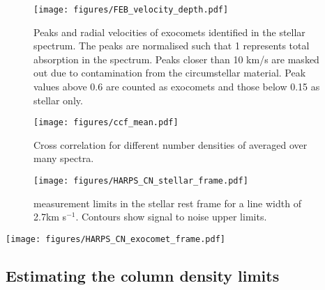 \documentclass{aa}
\newcommand{\kms}{km s$^{-1}$}
\begin{document}
\begin{figure}
    \begin{centering}
        \texttt{[image: figures/FEB\_velocity\_depth.pdf]}
        \caption{Peaks and radial velocities of exocomets identified in the stellar spectrum.
        The peaks are normalised such that 1 represents total absorption in the spectrum.
        Peaks closer than 10 km/s are masked out due to contamination from the circumstellar material.
        Peak values above 0.6 are counted as exocomets and those below 0.15 as stellar only.}
        \label{fig:FEB_velocity}
    \end{centering}
\end{figure}


\begin{figure}
    \begin{centering}
        \texttt{[image: figures/ccf\_mean.pdf]}
        \caption{Cross correlation for different number densities of  averaged over many spectra.}
        \label{fig:ccf_mean}
    \end{centering}
\end{figure}

\begin{figure}
    \begin{centering}
        \texttt{[image: figures/HARPS\_CN\_stellar\_frame.pdf]}
        \caption{ measurement limits in the stellar rest frame for a  line width of 2.7\kms{}. Contours show signal to noise upper limits.}
        \label{fig:CN_stellar_frame}
    \end{centering}
\end{figure}



\begin{figure*}
    \begin{centering}
        \texttt{[image: figures/HARPS\_CN\_exocomet\_frame.pdf]}
        \caption{ measurement limits in the exocomet frame for a  line width of 2.7, 10 and 20\kms{}. Contours show signal to noise upper limits.}
        \label{fig:CN_exocomet_frame}
    \end{centering}
\end{figure*}

\subsection{Estimating the \texorpdfstring{}{CN} column density limits}\label{sect:CNlim}
\end{document}
